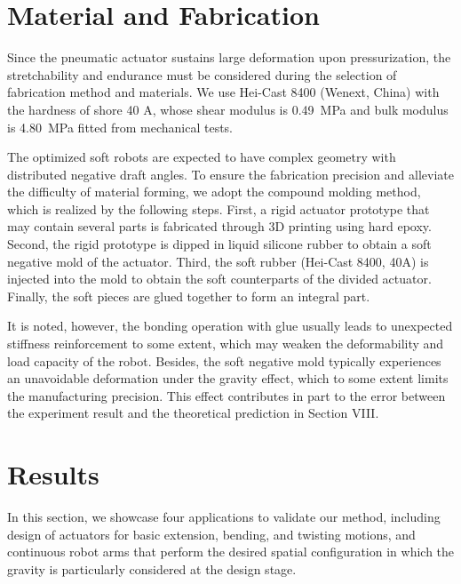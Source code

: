\documentclass[journal]{IEEEtran}
\theoremstyle{definition}
\begin{document}
\section{Material and Fabrication}
Since the pneumatic actuator sustains large deformation upon pressurization, the stretchability and endurance must be considered during the selection of fabrication method and materials. We use Hei-Cast 8400 (Wenext, China) with the hardness of shore 40 A, whose shear modulus is \SI{0.49}{MPa} and bulk modulus is \SI{4.80}{MPa} fitted from mechanical tests.

The optimized soft robots are expected to have complex geometry with distributed negative draft angles. To ensure the fabrication precision and alleviate the difficulty of material forming, we adopt the compound molding method, which is realized by the following steps. First, a rigid actuator prototype that may contain several parts is fabricated through 3D printing using hard epoxy. Second, the rigid prototype is dipped in liquid silicone rubber to obtain a soft negative mold of the actuator. Third, the soft rubber (Hei-Cast 8400, 40A) is injected into the mold to obtain the soft counterparts of the divided actuator. Finally, the soft pieces are glued together to form an integral part.

It is noted, however, the bonding operation with glue usually leads to unexpected stiffness reinforcement to some extent, which may weaken the deformability and load capacity of the robot. Besides, the soft negative mold typically experiences an unavoidable deformation under the gravity effect, which to some extent limits the manufacturing precision. This effect contributes in part to the error between the experiment result and the theoretical prediction in Section VIII.

\section{Results}
In this section, we showcase four applications to validate our method, including design of actuators for basic extension, bending, and twisting motions, and continuous robot arms that perform the desired spatial configuration in which the gravity is particularly considered at the design stage.
\end{document}
